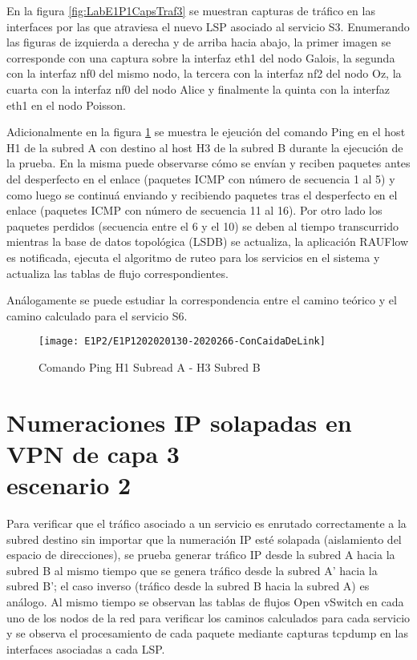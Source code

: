 En la figura \ref{fig:LabE1P1CapsTraf3} se muestran capturas de tr\'afico en las interfaces por las que atraviesa el nuevo LSP asociado al servicio S3. Enumerando las figuras de izquierda a derecha y de arriba hacia abajo, la primer imagen se corresponde con una captura sobre la interfaz eth1 del nodo Galois, la segunda con la interfaz nf0 del mismo nodo, la tercera con la interfaz nf2 del nodo Oz, la cuarta con la interfaz nf0 del nodo Alice y finalmente la quinta con la interfaz eth1 en el nodo Poisson.

Adicionalmente en la figura \ref{fig:LabE1P2CapHost} se muestra le ejeuci\'on del comando Ping en el host H1 de la subred A con destino al host H3 de la subred B durante la ejecuci\'on de la prueba. En la misma puede observarse c\'omo se envían y reciben paquetes antes del desperfecto en el enlace (paquetes ICMP con n\'umero de secuencia 1 al 5) y como luego se continu\'a enviando y recibiendo paquetes tras el desperfecto en el enlace (paquetes ICMP con n\'umero de secuencia 11 al 16). Por otro lado los paquetes perdidos (secuencia entre el 6 y el 10) se deben al tiempo transcurrido mientras la base de datos topol\'ogica (LSDB) se actualiza, la aplicaci\'on RAUFlow es notificada, ejecuta el algoritmo de ruteo para los servicios en el sistema y actualiza las tablas de flujo correspondientes.   

Análogamente se puede estudiar la correspondencia entre el camino te\'orico y el camino calculado para el servicio S6.

\begin{figure}[ht!] 
\centering    
\texttt{[image: E1P2/E1P1202020130-2020266-ConCaidaDeLink]}
\caption[Comando Ping H1 Subread A - H3 Subred B]{Comando Ping H1 Subread A - H3 Subred B}
\label{fig:LabE1P2CapHost}
\end{figure}

\section{Numeraciones IP solapadas en VPN de capa 3 \\ escenario 2}
\label{appendix6.4}
Para verificar que el tr\'afico asociado a un servicio es enrutado correctamente a la subred destino sin importar que la numeración IP est\'e solapada (aislamiento del espacio de direcciones), se prueba generar tr\'afico IP desde la subred A hacia la subred B al mismo tiempo que se genera tr\'afico desde la subred A' hacia la subred B'; el caso inverso (tr\'afico desde la subred B hacia la subred A) es an\'alogo. Al mismo tiempo se observan las tablas de flujos Open vSwitch en cada uno de los nodos de la red para verificar los caminos calculados para cada servicio y se observa el procesamiento de cada paquete mediante capturas tcpdump en las interfaces asociadas a cada LSP.

